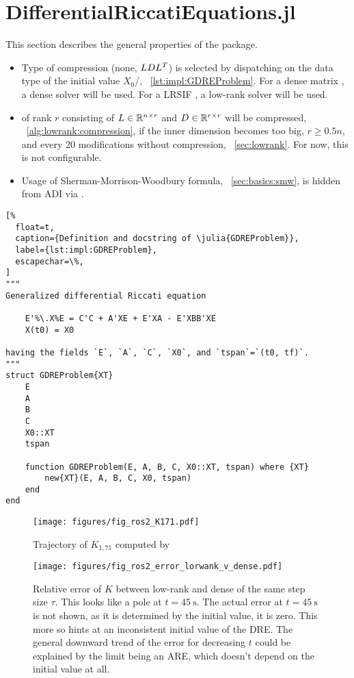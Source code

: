 \section{DifferentialRiccatiEquations.jl}
\label{sec:impl:DRE}

This section describes the general properties of the  package.

\begin{itemize}
  \item
    Type of compression (none, $LDL^T$) is selected by dispatching on the data type of the initial value $X_0$/,
    \cf~\autoref{lst:impl:GDREProblem}.
    For a dense matrix , a dense solver will be used.
    For a \ac{LRSIF} , a low-rank solver will be used.
  \item
     of rank $r$ consisting of $L \in\mathbb{R}^{n\times r}$ and $D\in\mathbb{R}^{r\times r}$ will be compressed,
    \cf~\autoref{alg:lowrank:compression},
    if the inner dimension becomes too big, $r \geq 0.5 n$,
    and every 20 modifications without compression,
    \cf~\autoref{sec:lowrank}.
    For now, this is not configurable.
  \item
    Usage of Sherman-Morrison-Woodbury formula, \cf~\autoref{sec:basics:smw},
    is hidden from \ac{ADI} via .
\end{itemize}

\begin{lstlisting}[%
  float=t,
  caption={Definition and docstring of \julia{GDREProblem}},
  label={lst:impl:GDREProblem},
  escapechar=\%,
]
"""
Generalized differential Riccati equation

    E'%\.X%E = C'C + A'XE + E'XA - E'XBB'XE
    X(t0) = X0

having the fields `E`, `A`, `C`, `X0`, and `tspan`=`(t0, tf)`.
"""
struct GDREProblem{XT}
    E
    A
    B
    C
    X0::XT
    tspan

    function GDREProblem(E, A, B, C, X0::XT, tspan) where {XT}
        new{XT}(E, A, B, C, X0, tspan)
    end
end
\end{lstlisting}

\begin{figure}[t]
  \texttt{[image: figures/fig\_ros2\_K171.pdf]}
  \caption{Trajectory of $K_{1,71}$ computed by }
\end{figure}

\begin{figure}[t]
  \texttt{[image: figures/fig\_ros2\_error\_lorwank\_v\_dense.pdf]}
  \caption[Relative error of $K$ for LRSIF  vs reference solution]{%
    Relative error of $K$ between low-rank and dense  of the same step size $\tau$.
    This looks like a pole at $t=\SI{45}{\second}$.
    The actual error at $t=\SI{45}{\second}$ is not shown, as it is determined by the initial value, \ie it is zero.
    This more so hints at an inconsistent initial value of the \ac{DRE}.
    The general downward trend of the error for decreasing $t$ could be explained by the limit being an \ac{ARE},
    which doesn't depend on the initial value at all.
  }
\end{figure}

